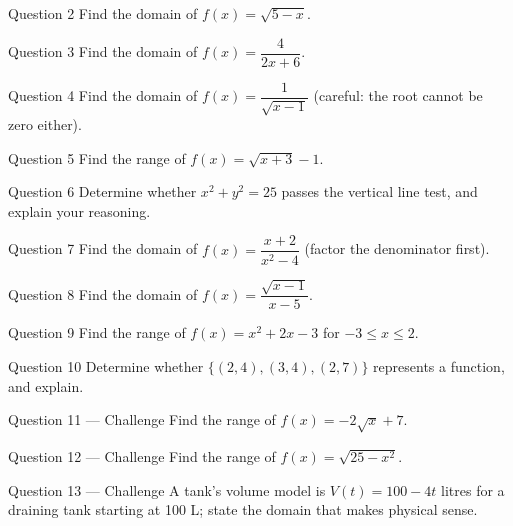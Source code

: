 \documentclass[11pt]{article}
\begin{document}
\begin{qbox}{Question 2}
Find the domain of $f(x)=\sqrt{5-x}$.\workspace{2.4cm}
\end{qbox}

\begin{qbox}{Question 3}
Find the domain of $f(x)=\dfrac{4}{2x+6}$.\workspace{2.4cm}
\end{qbox}

\begin{qbox}{Question 4}
Find the domain of $f(x)=\dfrac{1}{\sqrt{x-1}}$ (careful: the root cannot be zero either).\workspace{2.4cm}
\end{qbox}

\begin{qbox}{Question 5}
Find the range of $f(x)=\sqrt{x+3}-1$.\workspace{2.4cm}
\end{qbox}

\begin{qbox}{Question 6}
Determine whether $x^2+y^2=25$ passes the vertical line test, and explain your reasoning.\workspace{2.4cm}
\end{qbox}

\begin{qbox}{Question 7}
Find the domain of $f(x)=\dfrac{x+2}{x^2-4}$ (factor the denominator first).\workspace{2.4cm}
\end{qbox}

\begin{qbox}{Question 8}
Find the domain of $f(x)=\dfrac{\sqrt{x-1}}{x-5}$.\workspace{2.4cm}
\end{qbox}

\begin{qbox}{Question 9}
Find the range of $f(x)=x^2+2x-3$ for $-3\leq x\leq2$.\workspace{2.4cm}
\end{qbox}

\begin{qbox}{Question 10}
Determine whether $\{(2,4),(3,4),(2,7)\}$ represents a function, and explain.\workspace{2.4cm}
\end{qbox}

\begin{qbox}{Question 11 --- Challenge}
Find the range of $f(x)=-2\sqrt{x}+7$.\workspace{3.2cm}
\end{qbox}

\begin{qbox}{Question 12 --- Challenge}
Find the range of $f(x)=\sqrt{25-x^2}$.\workspace{3.2cm}
\end{qbox}

\begin{qbox}{Question 13 --- Challenge}
A tank's volume model is $V(t)=100-4t$ litres for a draining tank starting at 100 L; state the domain that makes physical sense.\workspace{3cm}
\end{qbox}
\end{document}
